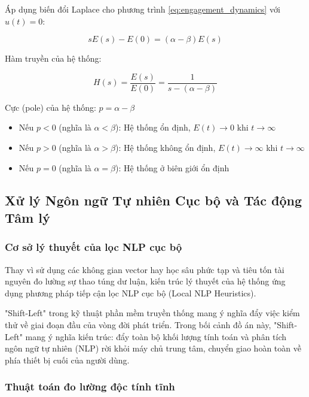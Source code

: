 Áp dụng biến đổi Laplace cho phương trình \eqref{eq:engagement_dynamics} với $u(t) = 0$:

\begin{equation}
    sE(s) - E(0) = (\alpha - \beta)E(s)
\end{equation}

Hàm truyền của hệ thống:

\begin{equation}
    H(s) = \frac{E(s)}{E(0)} = \frac{1}{s - (\alpha - \beta)}
\end{equation}

Cực (pole) của hệ thống: $p = \alpha - \beta$

\begin{itemize}
    \item Nếu $p < 0$ (nghĩa là $\alpha < \beta$): Hệ thống ổn định, $E(t) \to 0$ khi $t \to \infty$
    \item Nếu $p > 0$ (nghĩa là $\alpha > \beta$): Hệ thống không ổn định, $E(t) \to \infty$ khi $t \to \infty$
    \item Nếu $p = 0$ (nghĩa là $\alpha = \beta$): Hệ thống ở biên giới ổn định
\end{itemize}

\subsection{Xử lý Ngôn ngữ Tự nhiên Cục bộ và Tác động Tâm lý}

\subsubsection{Cơ sở lý thuyết của lọc NLP cục bộ}

Thay vì sử dụng các không gian vector hay học sâu phức tạp và tiêu tốn tài nguyên đo lường sự thao túng dư luận, kiến trúc lý thuyết của hệ thống ứng dụng phương pháp tiếp cận lọc NLP cục bộ (Local NLP Heuristics).

"Shift-Left" trong kỹ thuật phần mềm truyền thống mang ý nghĩa đẩy việc kiểm thử về giai đoạn đầu của vòng đời phát triển. Trong bối cảnh đồ án này, "Shift-Left" mang ý nghĩa kiến trúc: đẩy toàn bộ khối lượng tính toán và phân tích ngôn ngữ tự nhiên (NLP) rời khỏi máy chủ trung tâm, chuyển giao hoàn toàn về phía thiết bị cuối của người dùng.

\subsubsection{Thuật toán đo lường độc tính tĩnh}

